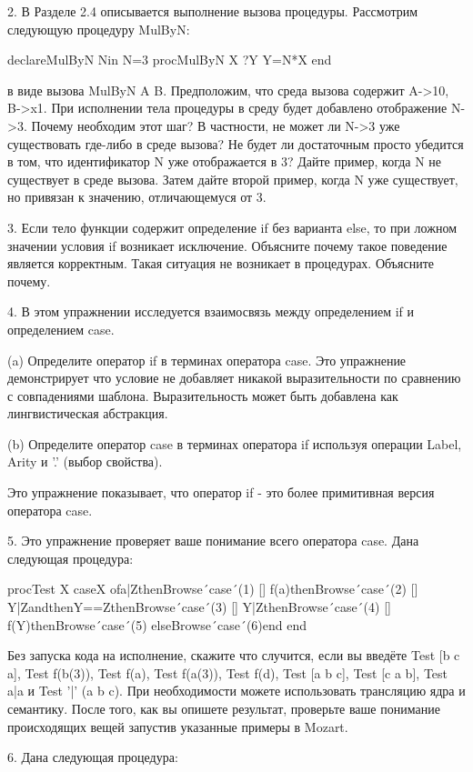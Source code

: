 2. В Разделе 2.4 описывается выполнение вызова процедуры. Рассмотрим следующую процедуру MulByN:

declareMulByN Nin
N=3
proc{MulByN X ?Y}
Y=N*X
end

в виде вызова {MulByN A B}. Предположим, что среда вызова содержит {A->10, B->x1}. При исполнении тела процедуры в среду будет добавлено отображение N->3. Почему необходим этот шаг? В частности, не может ли N->3 уже существовать где-либо в среде вызова? Не будет ли достаточным просто убедится в том, что идентификатор N уже отображается в 3? Дайте пример, когда N не существует в среде вызова. Затем дайте второй пример, когда N уже существует, но привязан к значению, отличающемуся от 3.

3. Если тело функции содержит определение if без варианта else, то при ложном значении условия if возникает исключение. Объясните почему такое поведение является корректным. Такая ситуация не возникает в процедурах. Объясните почему.

4. В этом упражнении исследуется взаимосвязь между определением if и определением case.

(a) Определите оператор if в терминах оператора case. Это упражнение демонстрирует что условие не добавляет никакой выразительности по сравнению с совпадениями шаблона. Выразительность может быть добавлена как лингвистическая абстракция.

(b) Определите оператор case в терминах оператора if используя операции Label, Arity и '.' (выбор свойства).

Это упражнение показывает, что оператор if - это более примитивная версия оператора case.

5. Это упражнение проверяет ваше понимание всего оператора case. Дана следующая процедура:

proc{Test X}
caseX
ofa|Zthen{Browse´case´(1)}
[] f(a)then{Browse´case´(2)}
[] Y|ZandthenY==Zthen{Browse´case´(3)}
[] Y|Zthen{Browse´case´(4)}
[] f(Y)then{Browse´case´(5)}
else{Browse´case´(6)}end
end

Без запуска кода на исполнение, скажите что случится, если вы введёте {Test [b c a]}, {Test f(b(3))}, {Test f(a)}, {Test f(a(3))}, {Test f(d)}, {Test [a b c]}, {Test [c a b]}, {Test a|a} и {Test '|' (a b c)}. При необходимости можете использовать трансляцию ядра и семантику. После того, как вы опишете результат, проверьте ваше понимание происходящих вещей запустив указанные примеры в Mozart.

6. Дана следующая процедура:

